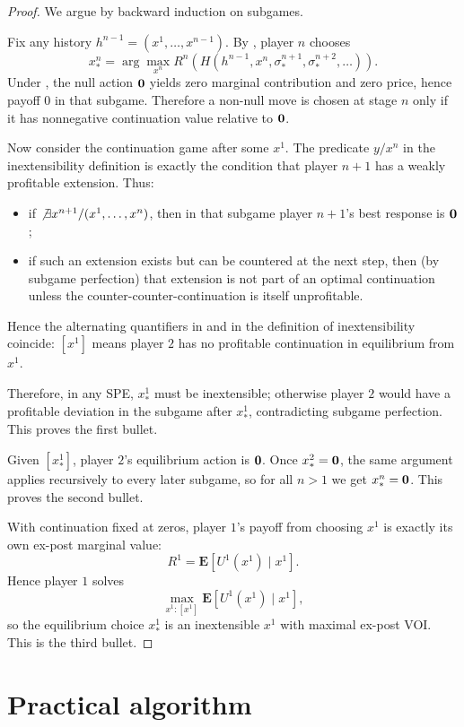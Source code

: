 \begin{proof}
We argue by backward induction on subgames.

Fix any history $h^{n-1}=(x^1,\dots,x^{n-1})$. By , player $n$ chooses
\[
x^n_*=\arg\max_{x^n}R^n(H(h^{n-1},x^n,\sigma_*^{n+1},\sigma_*^{n+2},\dots)).
\]
Under , the null action $\mathbf{0}$ yields zero marginal contribution and zero price, hence payoff $0$ in that subgame. Therefore a non-null move is chosen at stage $n$ only if it has nonnegative continuation value relative to $\mathbf{0}$.

Now consider the continuation game after some $x^1$. The predicate $y/x^n$ in the inextensibility definition is exactly the condition that player $n\!+\!1$ has a weakly profitable extension. Thus:
\begin{itemize}
\item if $\not\exists x^{n+1}/(x^1,\dots,x^n)$, then in that subgame player $n\!+\!1$'s best response is $\mathbf{0}$;
\item if such an extension exists but can be countered at the next step, then (by subgame perfection) that extension is not part of an optimal continuation unless the counter-counter-continuation is itself unprofitable.
\end{itemize}
Hence the alternating quantifiers in  and in the definition of inextensibility coincide: $[x^1]$ means player $2$ has no profitable continuation in equilibrium from $x^1$.

Therefore, in any SPE, $x^1_*$ must be inextensible; otherwise player $2$ would have a profitable deviation in the subgame after $x^1_*$, contradicting subgame perfection. This proves the first bullet.

Given $[x^1_*]$, player $2$'s equilibrium action is $\mathbf{0}$. Once $x^2_*=\mathbf{0}$, the same argument applies recursively to every later subgame, so for all $n>1$ we get $x^n_*=\mathbf{0}$. This proves the second bullet.

With continuation fixed at zeros, player $1$'s payoff from choosing $x^1$ is exactly its own ex-post marginal value:
\[
R^1=\mathbf{E}[U^1(x^1)\mid x^1].
\]
Hence player $1$ solves
\[
\max_{x^1:[x^1]}\mathbf{E}[U^1(x^1)\mid x^1],
\]
so the equilibrium choice $x^1_*$ is an inextensible $x^1$ with maximal ex-post VOI. This is the third bullet.
\end{proof}

\section{Practical algorithm}
\label{sec:practical}

